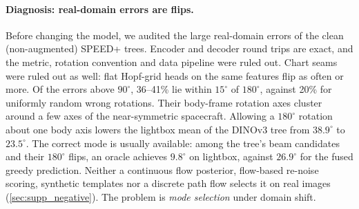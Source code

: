 \paragraph{Diagnosis: real-domain errors are flips.}
\label{sec:diagnosis}
Before changing the model, we audited the large real-domain errors of the clean (non-augmented) SPEED+ trees. Encoder and decoder round trips are exact, and the metric, rotation convention and data pipeline were ruled out. Chart seams were ruled out as well: flat Hopf-grid heads on the same features flip as often or more. Of the errors above $90^\circ$, 36--41\% lie within $15^\circ$ of $180^\circ$, against 20\% for uniformly random wrong rotations. Their body-frame rotation axes cluster around a few axes of the near-symmetric spacecraft. Allowing a $180^\circ$ rotation about one body axis lowers the lightbox mean of the DINOv3 tree from $38.9^\circ$ to $23.5^\circ$.
The correct mode is usually available: among the tree's beam candidates and their $180^\circ$ flips, an oracle achieves $9.8^\circ$ on lightbox, against $26.9^\circ$ for the fused greedy prediction. Neither a continuous flow posterior, flow-based re-noise scoring, synthetic templates nor a discrete path flow selects it on real images (\cref{sec:supp_negative}). The problem is \emph{mode selection} under domain shift.

\begin{table}[t]
  \centering\small
  \setlength{\tabcolsep}{5pt}
  
  \caption{\textbf{SPEED+ rotation, ground-truth crops.} Mean $E_R$ over 3 seeds ($\pm$ seed std), fraction of severe flips (${>}150^\circ$), and end-to-end latency at batch 1. The clean tree is trained without augmentation. The DINOv3 student is distilled from a DINOv3-only orbit teacher, and the PoE students from the PoE orbit teacher. Inference cost is unchanged by distillation.}
  \label{tab:main}
\end{table}


